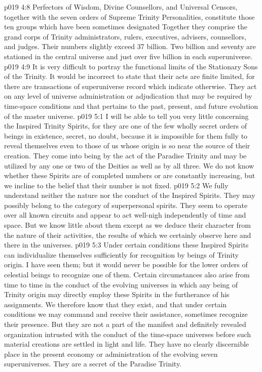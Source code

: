 \vs p019 4:8 \pc Perfectors of Wisdom, Divine Counsellors, and Universal Censors, together with the seven orders of Supreme Trinity Personalities, constitute those ten groups which have been sometimes designated  Together they comprise the grand corps of Trinity administrators, rulers, executives, advisers, counsellors, and judges. Their numbers slightly exceed 37 billion. Two billion and seventy are stationed in the central universe and just over five billion in each superuniverse.
\vs p019 4:9 It is very difficult to portray the functional limits of the Stationary Sons of the Trinity. It would be incorrect to state that their acts are finite limited, for there are transactions of superuniverse record which indicate otherwise. They act on any level of universe administration or adjudication that may be required by time\hyp{}space conditions and that pertains to the past, present, and future evolution of the master universe.
\vs p019 5:1 I will be able to tell you very little concerning the Inspired Trinity Spirits, for they are one of the few wholly secret orders of beings in existence, secret, no doubt, because it is impossible for them fully to reveal themselves even to those of us whose origin is so near the source of their creation. They come into being by the act of the Paradise Trinity and may be utilized by any one or two of the Deities as well as by all three. We do not know whether these Spirits are of completed numbers or are constantly increasing, but we incline to the belief that their number is not fixed.
\vs p019 5:2 We fully understand neither the nature nor the conduct of the Inspired Spirits. They may possibly belong to the category of superpersonal spirits. They seem to operate over all known circuits and appear to act well\hyp{}nigh independently of time and space. But we know little about them except as we deduce their character from the nature of their activities, the results of which we certainly observe here and there in the universes.
\vs p019 5:3 Under certain conditions these Inspired Spirits can individualize themselves sufficiently for recognition by beings of Trinity origin. I have seen them; but it would never be possible for the lower orders of celestial beings to recognize one of them. Certain circumstances also arise from time to time in the conduct of the evolving universes in which any being of Trinity origin may directly employ these Spirits in the furtherance of his assignments. We therefore know that they exist, and that under certain conditions we may command and receive their assistance, sometimes recognize their presence. But they are not a part of the manifest and definitely revealed organization intrusted with the conduct of the time\hyp{}space universes before such material creations are settled in light and life. They have no clearly discernible place in the present economy or administration of the evolving seven superuniverses. They are a secret of the Paradise Trinity.
